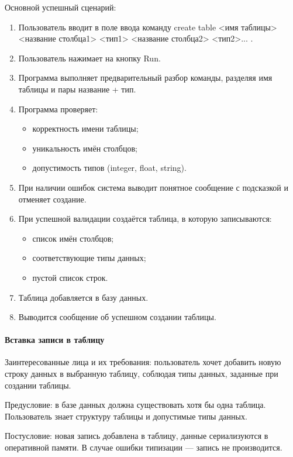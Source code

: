 Основной успешный сценарий:
\begin{enumerate}
	\item Пользователь вводит в поле ввода команду create table <имя таблицы> <название столбца1> <тип1> <название столбца2> <тип2>... .
	\item Пользователь нажимает на кнопку Run.	
	\item Программа выполняет предварительный разбор команды, разделяя имя таблицы и пары название + тип.	
	\item Программа проверяет:
	\begin{itemize}
		\item корректность имени таблицы;	
		\item уникальность имён столбцов;	
		\item допустимость типов (integer, float, string).
	\end{itemize}
	\item При наличии ошибок система выводит понятное сообщение с подсказкой и отменяет создание.	
	\item При успешной валидации создаётся таблица, в которую записываются:
	\begin{itemize}
		\item список имён столбцов;	
		\item соответствующие типы данных;	
		\item пустой список строк.
	\end{itemize}	
	\item Таблица добавляется в базу данных.	
	\item Выводится сообщение об успешном создании таблицы.
\end{enumerate}

\paragraph{Вставка записи в таблицу}

Заинтересованные лица и их требования: пользователь хочет добавить новую строку данных в выбранную таблицу, соблюдая типы данных, заданные при создании таблицы.

Предусловие: в базе данных должна существовать хотя бы одна таблица. Пользователь знает структуру таблицы и допустимые типы данных.

Постусловие: новая запись добавлена в таблицу, данные сериализуются в оперативной памяти. В случае ошибки типизации — запись не производится.

